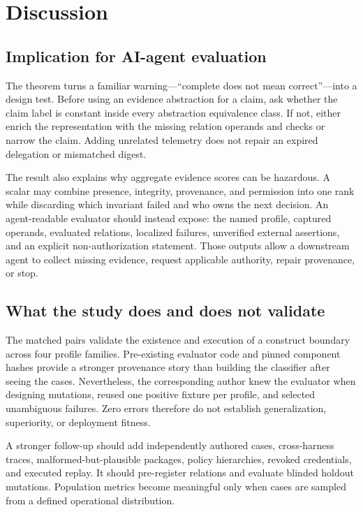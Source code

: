 \documentclass[preprint,12pt]{elsarticle}
\begin{document}
\section{Discussion}

\subsection{Implication for AI-agent evaluation}

The theorem turns a familiar warning---``complete does not mean correct''---into a design test. Before using an evidence abstraction for a claim, ask whether the claim label is constant inside every abstraction equivalence class. If not, either enrich the representation with the missing relation operands and checks or narrow the claim. Adding unrelated telemetry does not repair an expired delegation or mismatched digest.

The result also explains why aggregate evidence scores can be hazardous. A scalar may combine presence, integrity, provenance, and permission into one rank while discarding which invariant failed and who owns the next decision. An agent-readable evaluator should instead expose: the named profile, captured operands, evaluated relations, localized failures, unverified external assertions, and an explicit non-authorization statement. Those outputs allow a downstream agent to collect missing evidence, request applicable authority, repair provenance, or stop.

\subsection{What the study does and does not validate}

The matched pairs validate the existence and execution of a construct boundary across four profile families. Pre-existing evaluator code and pinned component hashes provide a stronger provenance story than building the classifier after seeing the cases. Nevertheless, the corresponding author knew the evaluator when designing mutations, reused one positive fixture per profile, and selected unambiguous failures. Zero errors therefore do not establish generalization, superiority, or deployment fitness.

A stronger follow-up should add independently authored cases, cross-harness traces, malformed-but-plausible packages, policy hierarchies, revoked credentials, and executed replay. It should pre-register relations and evaluate blinded holdout mutations. Population metrics become meaningful only when cases are sampled from a defined operational distribution.
\end{document}
